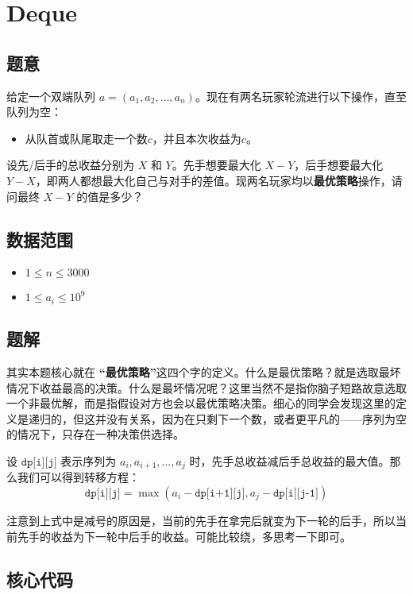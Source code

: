\section{Deque}
\subsection*{题意}

 给定一个双端队列 $a = (a_1, a_2, \ldots, a_n)$。现在有两名玩家轮流进行以下操作，直至队列为空：
 \begin{itemize}
\item 从队首或队尾取走一个数$c$，并且本次收益为$c$。
\end{itemize}

设先/后手的总收益分别为 $X$ 和 $Y$。先手想要最大化 $X-Y$，后手想要最大化 $Y-X$，即两人都想最大化自己与对手的差值。现两名玩家均以\textbf{最优策略}操作，请问最终 $X-Y$ 的值是多少？




\subsection*{数据范围}
\begin{itemize}
\item $1 \leq n \leq 3000$
\item $1 \leq a_i \leq 10^9$
\end{itemize}

\subsection*{题解}

其实本题核心就在 \textbf{“最优策略”}这四个字的定义。什么是最优策略？就是选取最坏情况下收益最高的决策。什么是最坏情况呢？这里当然不是指你脑子短路故意选取一个非最优解，而是指假设对方也会以最优策略决策。细心的同学会发现这里的定义是递归的，但这并没有关系，因为在只剩下一个数，或者更平凡的——序列为空的情况下，只存在一种决策供选择。

设 ${\texttt{dp[i][j]}}$ 表示序列为 $a_i,a_{i+1},\ldots,a_j$ 时，先手总收益减后手总收益的最大值。那么我们可以得到转移方程：
$$
{\texttt{dp[i][j]}} = \max(a_i - {\texttt{dp[i+1][j]}},a_{j} - {\texttt{dp[i][j-1]}})
$$

注意到上式中是减号的原因是，当前的先手在拿完后就变为下一轮的后手，所以当前先手的收益为下一轮中后手的收益。可能比较绕，多思考一下即可。


\subsection*{核心代码}
\inputminted[linenos,autogobble]{cpp}{../Code/L.cpp}
\newpage
